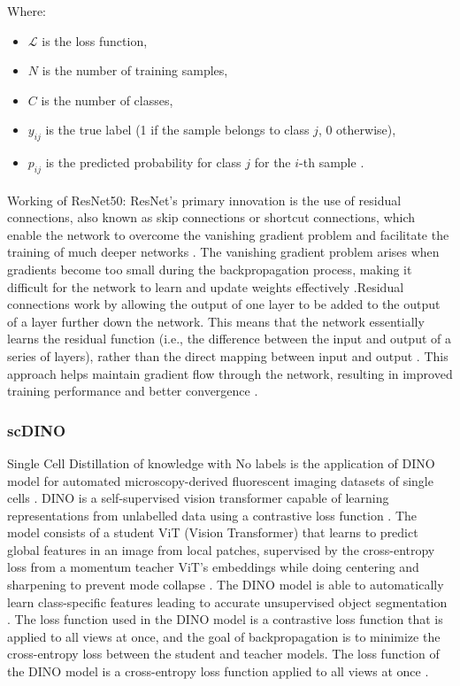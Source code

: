 \documentclass[12pt,a4paper]{article}
\begin{document}
Where:
\begin{itemize}
\item $\mathcal{L}$ is the loss function,
\item $N$ is the number of training samples,
\item $C$ is the number of classes,
\item $y_{ij}$ is the true label (1 if the sample belongs to class $j$, 0 otherwise),
\item $p_{ij}$ is the predicted probability for class $j$ for the $i$-th sample \cite{DBLP:journals/corr/HeZRS15}.
\end{itemize}

\paragraph{} Working of ResNet50: ResNet's primary innovation is the use of residual connections, also known as skip connections or shortcut connections, which enable the network to overcome the vanishing gradient problem and facilitate the training of much deeper networks \cite{DBLP:journals/corr/HeZRS15}. The vanishing gradient problem arises when gradients become too small during the backpropagation process, making it difficult for the network to learn and update weights effectively \cite{DBLP:journals/corr/HeZRS15}.Residual connections work by allowing the output of one layer to be added to the output of a layer further down the network. This means that the network essentially learns the residual function (i.e., the difference between the input and output of a series of layers), rather than the direct mapping between input and output \cite{DBLP:journals/corr/HeZRS15}. This approach helps maintain gradient flow through the network, resulting in improved training performance and better convergence \cite{DBLP:journals/corr/HeZRS15}.

\subsubsection{scDINO}
Single Cell Distillation of knowledge with No labels is the application of DINO model for automated microscopy-derived fluorescent imaging datasets of single cells \cite{Pfaendler2023.01.16.524226}. DINO is a self-supervised vision transformer capable of learning representations from unlabelled data using a contrastive loss function \cite{Pfaendler2023.01.16.524226}. The model consists of a student ViT (Vision Transformer) that learns to predict global features in an image from local patches, supervised by the cross-entropy loss from a momentum teacher ViT's embeddings while doing centering and sharpening to prevent mode collapse \cite{Pfaendler2023.01.16.524226}. The DINO model is able to automatically learn class-specific features leading to accurate unsupervised object segmentation \cite{Pfaendler2023.01.16.524226}. The loss function used in the DINO model is a contrastive loss function that is applied to all views at once, and the goal of backpropagation is to minimize the cross-entropy loss between the student and teacher models. The loss function of the DINO model is a cross-entropy loss function applied to all views at once \cite{Pfaendler2023.01.16.524226}.
\end{document}
